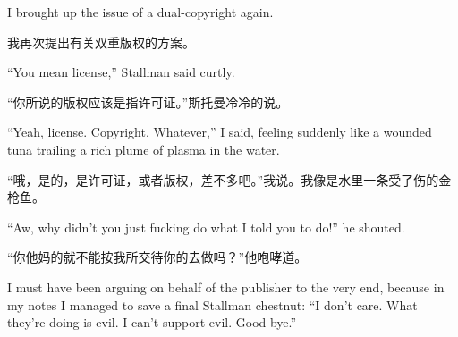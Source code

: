 
\ifdefined\eng
I brought up the issue of a dual-copyright again.
\fi

\ifdefined\chs
我再次提出有关双重版权的方案。
\fi

\ifdefined\eng
``You mean license,'' Stallman said curtly.
\fi

\ifdefined\chs
``你所说的版权应该是指许可证。''斯托曼冷冷的说。
\fi

\ifdefined\eng
``Yeah, license. Copyright. Whatever,'' I said, feeling suddenly like a wounded tuna trailing a rich plume of plasma in the water.
\fi

\ifdefined\chs
``哦，是的，是许可证，或者版权，差不多吧。''我说。我像是水里一条受了伤的金枪鱼。
\fi

\ifdefined\eng
``Aw, why didn't you just fucking do what I told you to do!'' he shouted.  %
\fi

\ifdefined\chs
``你他妈的就不能按我所交待你的去做吗？''他咆哮道。%
\fi

\ifdefined\eng
I must have been arguing on behalf of the publisher to the very end, because in my notes I managed to save a final Stallman chestnut: ``I don't care. What they're doing is evil. I can't support evil. Good-bye.''  %
\fi

